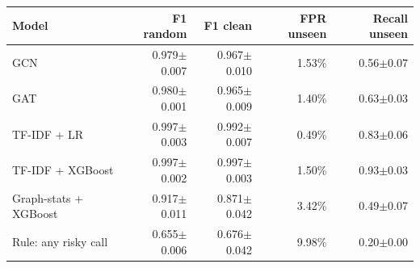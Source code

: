 \begin{tabular}{@{}lrrrr@{}}
\toprule
Model & F1 random & F1 clean & FPR unseen & Recall unseen \\ \midrule
GCN & 0.979$\pm$0.007 & 0.967$\pm$0.010 & 1.53\% & 0.56$\pm$0.07 \\
GAT & 0.980$\pm$0.001 & 0.965$\pm$0.009 & 1.40\% & 0.63$\pm$0.03 \\
TF-IDF + LR & 0.997$\pm$0.003 & 0.992$\pm$0.007 & 0.49\% & 0.83$\pm$0.06 \\
TF-IDF + XGBoost & 0.997$\pm$0.002 & 0.997$\pm$0.003 & 1.50\% & 0.93$\pm$0.03 \\
Graph-stats + XGBoost & 0.917$\pm$0.011 & 0.871$\pm$0.042 & 3.42\% & 0.49$\pm$0.07 \\
Rule: any risky call & 0.655$\pm$0.006 & 0.676$\pm$0.042 & 9.98\% & 0.20$\pm$0.00 \\
\bottomrule
\end{tabular}
